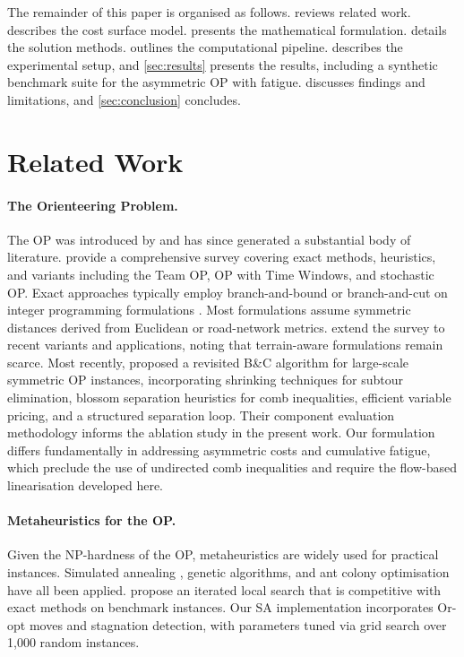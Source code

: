\documentclass[11pt,a4paper]{article}
\begin{document}
The remainder of this paper is organised as follows.
 reviews related work.
 describes the cost surface model.
 presents the mathematical formulation.
 details the solution methods.
 outlines the computational pipeline.
 describes the experimental setup, and \cref{sec:results} presents the results, including a synthetic benchmark suite for the asymmetric OP with fatigue.
 discusses findings and limitations, and \cref{sec:conclusion} concludes.

\section{Related Work}
\label{sec:related}

\paragraph{The Orienteering Problem.}
The OP was introduced by \citet{tsiligirides1984heuristic} and has since generated a substantial body of literature.
\citet{vansteenwegen2011orienteering} provide a comprehensive survey covering exact methods, heuristics, and variants including the Team OP, OP with Time Windows, and stochastic OP.
Exact approaches typically employ branch-and-bound or branch-and-cut on integer programming formulations \citep{fischetti1998solving}.
Most formulations assume symmetric distances derived from Euclidean or road-network metrics.
\citet{gunawan2016orienteering} extend the survey to recent variants and applications, noting that terrain-aware formulations remain scarce.
Most recently, \citet{kobeaga2021revisited} proposed a revisited B\&C algorithm for large-scale symmetric OP instances, incorporating shrinking techniques for subtour elimination, blossom separation heuristics for comb inequalities, efficient variable pricing, and a structured separation loop.
Their component evaluation methodology informs the ablation study in the present work.
Our formulation differs fundamentally in addressing asymmetric costs and cumulative fatigue, which preclude the use of undirected comb inequalities and require the flow-based linearisation developed here.

\paragraph{Metaheuristics for the OP.}
Given the NP-hardness of the OP, metaheuristics are widely used for practical instances.
Simulated annealing \citep{kirkpatrick1983sa}, genetic algorithms, and ant colony optimisation have all been applied.
\citet{vansteenwegen2009iterated} propose an iterated local search that is competitive with exact methods on benchmark instances.
Our SA implementation incorporates Or-opt moves and stagnation detection, with parameters tuned via grid search over 1{,}000 random instances.
\end{document}
